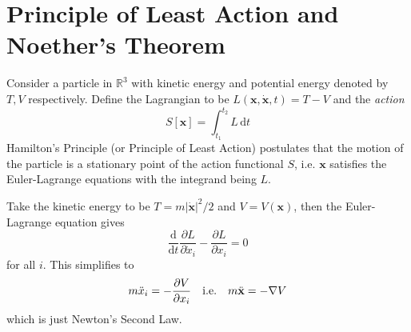 \documentclass{article}
\begin{document}
\section{Principle of Least Action and Noether's Theorem}
Consider a particle in $\mathbb R^3$ with kinetic energy and potential energy denoted by $T,V$ respectively.
Define the Lagrangian to be $L(\mathbf{x},\mathbf{\dot{x}},t)=T-V$ and the \textit{action}
$$S[\mathbf{x}]=\int_{t_1}^{t_2}L\,\mathrm dt$$
Hamilton's Principle (or Principle of Least Action) postulates that the motion of the particle is a stationary point of the action functional $S$, i.e. $\mathbf{x}$ satisfies the Euler-Lagrange equations with the integrand being $L$.
\begin{example}
    Take the kinetic energy to be $T=m|\mathbf{\dot{x}}|^2/2$ and $V=V(\mathbf{x})$, then the Euler-Lagrange equation gives
    $$\frac{\mathrm d}{\mathrm dt}\frac{\partial L}{\partial \dot{x}_i}-\frac{\partial L}{\partial x_i}=0$$
    for all $i$.
    This simplifies to
    $$m\ddot{x}_i=-\frac{\partial V}{\partial x_i}\quad \text{i.e.}\quad m \ddot{{\bf x}}= - \nabla V$$
    which is just Newton's Second Law.
\end{example}
\newpage
\end{document}
